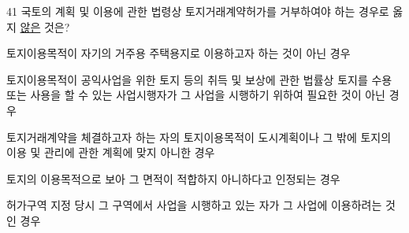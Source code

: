 \begin{question}{41}
국토의 계획 및 이용에 관한 법령상 토지거래계약허가를 거부하여야 하는 경우로 옳지 \uline{않은} 것은?
\begin{choices}
  \item 토지이용목적이 자기의 거주용 주택용지로 이용하고자 하는 것이 아닌 경우
  \item 토지이용목적이 공익사업을 위한 토지 등의 취득 및 보상에 관한 법률상 토지를 수용 또는 사용을 할 수 있는 사업시행자가 그 사업을 시행하기 위하여 필요한 것이 아닌 경우
  \item 토지거래계약을 체결하고자 하는 자의 토지이용목적이 도시계획이나 그 밖에 토지의 이용 및 관리에 관한 계획에 맞지 아니한 경우
  \item 토지의 이용목적으로 보아 그 면적이 적합하지 아니하다고 인정되는 경우
  \item 허가구역 지정 당시 그 구역에서 사업을 시행하고 있는 자가 그 사업에 이용하려는 것인 경우
\end{choices}
\end{question}

